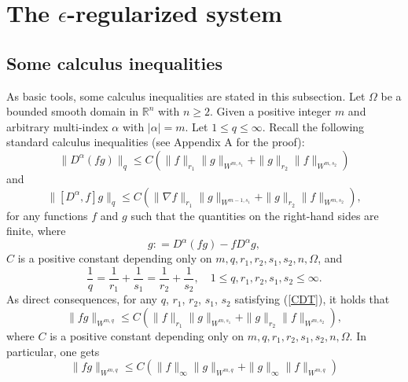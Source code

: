 \documentclass[12pt,reqno]{amsart}
\numberwithin{equation}{section}
\begin{document}

\section{The $\epsilon$-regularized system}
\label{sec3}
\subsection{Some calculus inequalities}
As basic tools, some calculus inequalities are stated in this subsection. Let $\Omega$ be a bounded smooth domain in $\mathbb R^n$ with $n\geq2$. Given a positive integer $m$ and arbitrary multi-index $\alpha$ with $|\alpha|=m$. Let $1\leq q\leq\infty$. Recall the following standard calculus inequalities (see Appendix A for the proof):
\begin{equation}
  \|D^\alpha(fg)\|_q\leq C\left(\|f\|_{r_1}\|g\|_{W^{m, s_1}}+\|g\|_{r_2}\|f\|_{W^{m,s_2}}\right) \label{CAL}
\end{equation}
and
\begin{equation}
  \|[D^\alpha, f]g\|_q\leq C\left(\|\nabla f\|_{r_1}\|g\|_{W^{m-1, s_1}}+\|g\|_{r_2}\|f\|_{W^{m,s_2}}\right),\label{COME}
\end{equation}
for any functions $f$ and $g$ such that the quantities on the right-hand sides are finite, where
\begin{equation}
  [D^\alpha, f]g : = D^\alpha(fg) - f D^\alpha g,
\end{equation}
$C$ is a positive constant depending only on $m, q, r_1, r_2, s_1, s_2,n,\Omega$, and
\begin{equation}\label{CDT}
\frac1q=\frac{1}{r_1}+\frac{1}{s_1}=\frac{1}{r_2}+\frac{1}{s_2}, \quad 1\leq q, r_1, r_2, s_1, s_2\leq\infty.
\end{equation}
As direct consequences,
for any $q$, $r_1$, $r_2$, $s_1$, $s_2$ satisfying (\ref{CDT}), it holds that
$$
\|fg\|_{W^{m,q}}\leq C\left(\|f\|_{r_1}\|g\|_{W^{m, s_1}}+\|g\|_{r_2}\|f\|_{W^{m,s_2}}\right),
$$
where $C$ is a positive constant depending only on $m, q, r_1, r_2, s_1, s_2,n,\Omega$. In particular, one gets
\begin{equation}\label{ALGmq}
  \|fg\|_{W^{m,q}}\leq C\left(\|f\|_{\infty}\|g\|_{W^{m,q}}+\|g\|_{\infty}\|f\|_{W^{m,q}}\right)
\end{equation}
\end{document}
